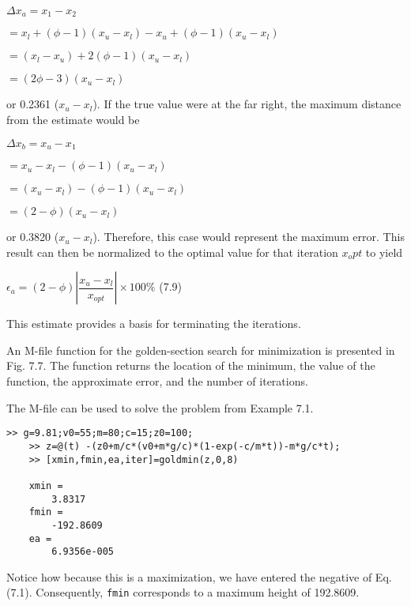 \documentclass[../main.tex]{subfiles}
\begin{document}
$\Delta x_a = x_1 - x_2$
\medskip

$=x_l + (\phi - 1)(x_u - x_l ) - x_u + (\phi - 1)(x_u - x_l )$
\medskip

$=(x_l - x_u) + 2(\phi - 1)(x_u - x_l )$
\medskip

$=(2\phi - 3)(x_u - x_l )$
\medskip

\noindent or 0.2361 ($x_u - x_l$). If the true value were at the far right, the maximum distance from the
estimate would be

$\Delta x_b = x_u - x_1$
\medskip

$=x_u - x_l - (\phi - 1)(x_u - x_l )$
\medskip

$=(x_u - x_l) - (\phi - 1)(x_u - x_l )$
\medskip

$=(2 -\phi)(x_u - x_l)$
\medskip

\noindent or 0.3820 ($x_u - x_l$). Therefore, this case would represent the maximum error. This result can
then be normalized to the optimal value for that iteration $x_opt$ to yield

$\epsilon_a = (2 - \phi)|\dfrac{x_u-x_l}{x_{opt}}|\times 100\% $ \hfill {(7.9)}

\noindent This estimate provides a basis for terminating the iterations.

An M-file function for the golden-section search for minimization is presented in
Fig. 7.7. The function returns the location of the minimum, the value of the function, the
approximate error, and the number of iterations.

The M-file can be used to solve the problem from Example 7.1.

\begin{lstlisting}[numbers=none,frame=none]
	>> g=9.81;v0=55;m=80;c=15;z0=100;
	>> z=@(t) -(z0+m/c*(v0+m*g/c)*(1-exp(-c/m*t))-m*g/c*t);
	>> [xmin,fmin,ea,iter]=goldmin(z,0,8)

	xmin =
		3.8317
	fmin =
		-192.8609
	ea =
		6.9356e-005
\end{lstlisting}

\noindent Notice how because this is a maximization, we have entered the negative of Eq. (7.1).
Consequently, \texttt{fmin} corresponds to a maximum height of 192.8609.
\end{document}
